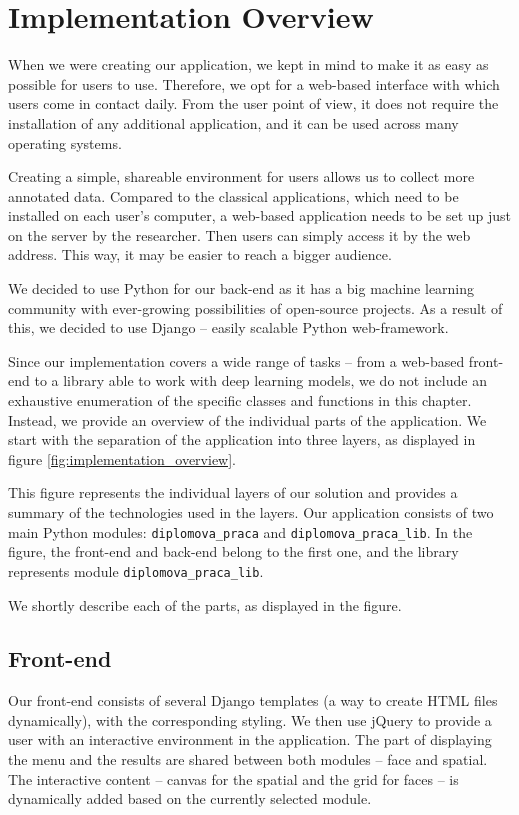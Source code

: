 \chapter{Implementation Overview}
\label{ch:developers_guide}
\label{ch:programmers_guide}

When we were creating our application, we kept in mind to make it as easy as possible for users to use. Therefore, we opt for a web-based interface with which users come in contact daily. From the user point of view, it does not require the installation of any additional application, and it can be used across many operating systems.

Creating a simple, shareable environment for users allows us to collect more annotated data. Compared to the classical applications, which need to be installed on each user's computer, a web-based application needs to be set up just on the server by the researcher. Then users can simply access it by the web address. This way, it may be easier to reach a bigger audience.

We decided to use Python for our back-end as it has a big machine learning community with ever-growing possibilities of open-source projects. As a result of this, we decided to use Django -- easily scalable Python web-framework.

Since our implementation covers a wide range of tasks -- from a web-based front-end to a library able to work with deep learning models, we do not include an exhaustive enumeration of the specific classes and functions in this chapter. Instead, we provide an overview of the individual parts of the application. We start with the separation of the application into three layers, as displayed in figure \ref{fig:implementation_overview}.

This figure represents the individual layers of our solution and provides a summary of the technologies used in the layers. Our application consists of two main Python modules: \verb+diplomova_praca+ and \verb+diplomova_praca_lib+. In the figure, the front-end and back-end belong to the first one, and the library represents module \verb+diplomova_praca_lib+.

We shortly describe each of the parts, as displayed in the figure.

\section{Front-end}

Our front-end consists of several Django templates (a way to create HTML files dynamically), with the corresponding styling. We then use jQuery to provide a user with an interactive environment in the application.  The part of displaying the menu and the results are shared between both modules -- face and spatial. The interactive content -- canvas for the spatial and the grid for faces -- is dynamically added based on the currently selected module.

